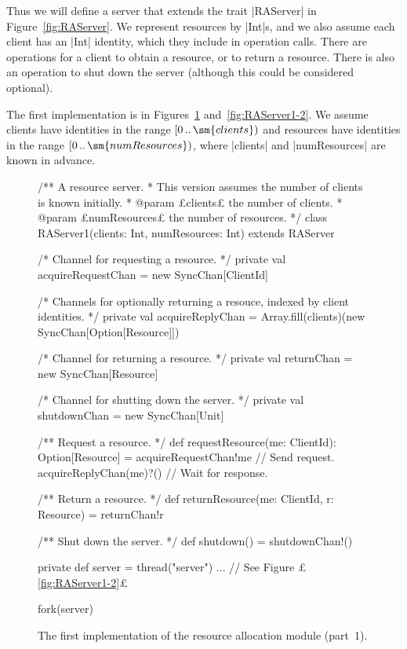 
Thus we will define a server that extends the trait |RAServer| in
Figure~\ref{fig:RAServer}.  We represent resources by |Int|s, and we also
assume each client has an |Int| identity, which they include in operation
calls.  There are operations for a client to obtain a resource, or to return a
resource.  There is also an operation to shut down the server (although this
could be considered optional).


The first implementation is in Figures~\ref{fig:RAServer1-1}
and~\ref{fig:RAServer1-2}.  We assume clients have identities in the range
$\interval0{\sm{clients}}$ and resources have identities in the range
$\interval0{\sm{numResources}}$, where |clients| and |numResources| are known
in advance.


\begin{figure}
\begin{scala}
/** A resource server. 
  * This version assumes the number of clients is known initially. 
  * @param £clients£ the number of clients.
  * @param £numResources£ the number of resources.  */
class RAServer1(clients: Int, numResources: Int) extends RAServer{

  /* Channel for requesting a resource. */
  private val acquireRequestChan = new SyncChan[ClientId]

  /* Channels for optionally returning a resouce, indexed by client identities. */
  private val acquireReplyChan = 
    Array.fill(clients)(new SyncChan[Option[Resource]])

  /* Channel for returning a resource. */
  private val returnChan = new SyncChan[Resource]

  /* Channel for shutting down the server. */
  private val shutdownChan = new SyncChan[Unit]

  /** Request a resource. */
  def requestResource(me: ClientId): Option[Resource] = {
    acquireRequestChan!me  // Send request.
    acquireReplyChan(me)?() // Wait for response.
  }

  /** Return a resource. */
  def returnResource(me: ClientId, r: Resource) = returnChan!r

  /** Shut down the server. */
  def shutdown() = shutdownChan!()

  private def server = thread("server"){ ...  } // See Figure £\ref{fig:RAServer1-2}£

  fork(server)
}
\end{scala}
\caption{The first implementation of the resource allocation module (part~1).}
\label{fig:RAServer1-1} 
\end{figure}

